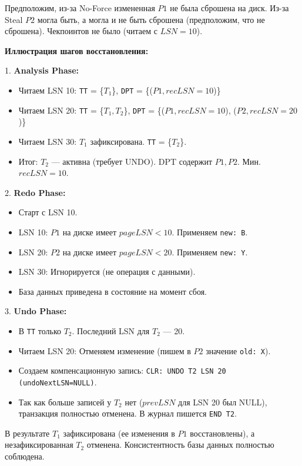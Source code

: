 \documentclass[a4paper,12pt]{article}
\begin{document}
Предположим, из-за No-Force измененная $P1$ не была сброшена на диск. Из-за Steal $P2$ могла быть, а могла и не быть сброшена (предположим, что не сброшена). Чекпоинтов не было (читаем с $LSN=10$).

\textbf{Иллюстрация шагов восстановления:}

1. \textbf{Analysis Phase:}
\begin{itemize}
    \item Читаем LSN 10: \texttt{TT} = \{$T_1$\}, \texttt{DPT} = \{($P1, recLSN=10$)\}
    \item Читаем LSN 20: \texttt{TT} = \{$T_1, T_2$\}, \texttt{DPT} = \{($P1, recLSN=10$), ($P2, recLSN=20$)\}
    \item Читаем LSN 30: $T_1$ зафиксирована. \texttt{TT} = \{$T_2$\}.
    \item Итог: $T_2$ — активна (требует UNDO). DPT содержит $P1, P2$. Мин. $recLSN = 10$.
\end{itemize}

2. \textbf{Redo Phase:}
\begin{itemize}
    \item Старт с LSN 10.
    \item LSN 10: $P1$ на диске имеет $pageLSN < 10$. Применяем \texttt{new: B}.
    \item LSN 20: $P2$ на диске имеет $pageLSN < 20$. Применяем \texttt{new: Y}.
    \item LSN 30: Игнорируется (не операция с данными).
    \item База данных приведена в состояние на момент сбоя.
\end{itemize}

3. \textbf{Undo Phase:}
\begin{itemize}
    \item В \texttt{TT} только $T_2$. Последний LSN для $T_2$ — 20.
    \item Читаем LSN 20: Отменяем изменение (пишем в $P2$ значение \texttt{old: X}).
    \item Создаем компенсационную запись: \texttt{CLR: UNDO T2 LSN 20 (undoNextLSN=NULL)}.
    \item Так как больше записей у $T_2$ нет ($prevLSN$ для LSN 20 был NULL), транзакция полностью отменена. В журнал пишется \texttt{END T2}.
\end{itemize}

В результате $T_1$ зафиксирована (ее изменения в $P1$ восстановлены), а незафиксированная $T_2$ отменена. Консистентность базы данных полностью соблюдена.
\end{document}
